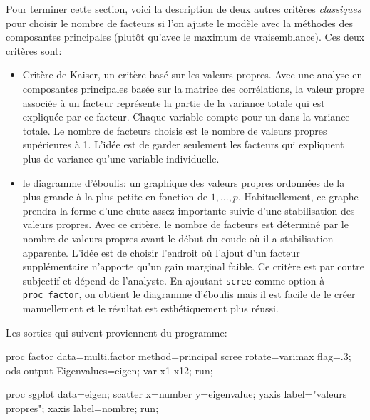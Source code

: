 \documentclass[
  11pt,
  letterpaper,
]{book}
\newenvironment{Shaded}{\begin{snugshade}}{\end{snugshade}}
\newcommand{\NormalTok}[1]{#1}
\providecommand{\tightlist}{%
  \setlength{\itemsep}{0pt}\setlength{\parskip}{0pt}}
\theoremstyle{definition}
\theoremstyle{definition}
\theoremstyle{definition}
\theoremstyle{definition}
\theoremstyle{remark}
\begin{document}
Pour terminer cette section, voici la description de deux autres
critères \emph{classiques} pour choisir le nombre de facteurs si l'on ajuste le modèle avec la méthodes des composantes principales (plutôt qu'avec le maximum de vraisemblance). Ces deux critères sont:

\begin{itemize}
\tightlist
\item
  Critère de Kaiser, un critère basé sur les valeurs propres. Avec une analyse en composantes principales basée sur la matrice des corrélations, la valeur propre associée à un facteur représente la partie de la variance totale qui est expliquée par ce facteur. Chaque variable compte pour un dans la variance totale. Le nombre de facteurs choisis est le nombre de valeurs propres supérieures à 1. L'idée est de garder seulement les facteurs qui expliquent plus de variance qu'une variable individuelle.
\item
  le diagramme d'éboulis: un graphique des valeurs propres ordonnées de la plus grande à la plus petite en fonction de \(1, \ldots, p\). Habituellement, ce graphe prendra la forme d'une chute assez importante suivie d'une stabilisation des valeurs propres. Avec ce critère, le nombre de facteurs est déterminé par le nombre de valeurs propres avant le début du coude où il a stabilisation apparente. L'idée est de choisir l'endroit où l'ajout d'un facteur supplémentaire n'apporte qu'un gain marginal faible. Ce critère est par contre subjectif et dépend de l'analyste. En ajoutant \texttt{scree} comme option à \texttt{proc\ factor}, on obtient le diagramme d'éboulis mais il est facile de le créer manuellement et le résultat est esthétiquement plus réussi.
\end{itemize}

Les sorties qui suivent proviennent du programme:

\begin{Shaded}
\begin{Highlighting}[]
\NormalTok{proc factor data=multi.factor method=principal}
\NormalTok{ scree rotate=varimax flag=.3;}
\NormalTok{ ods output Eigenvalues=eigen;}
\NormalTok{ var x1{-}x12;}
\NormalTok{run; }

\NormalTok{proc sgplot data=eigen;}
\NormalTok{ scatter x=number y=eigenvalue;}
\NormalTok{ yaxis label="valeurs propres";}
\NormalTok{ xaxis label=\textquotesingle{}nombre\textquotesingle{};}
\NormalTok{run;}
\end{Highlighting}
\end{Shaded}
\end{document}
